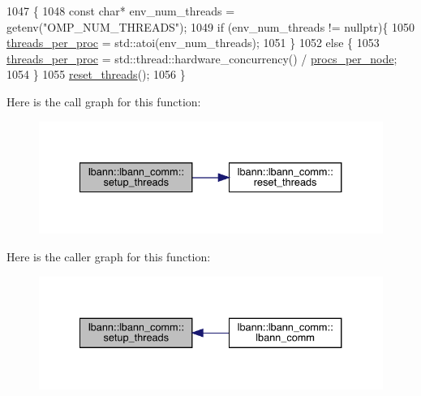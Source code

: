 \begin{DoxyCode}
1047                                \{
1048   \textcolor{keyword}{const} \textcolor{keywordtype}{char}* env\_num\_threads = getenv(\textcolor{stringliteral}{"OMP\_NUM\_THREADS"});
1049   \textcolor{keywordflow}{if} (env\_num\_threads != \textcolor{keyword}{nullptr})\{
1050     \hyperlink{classlbann_1_1lbann__comm_a23ff8e3563e4472af29d15f6cb823bc1}{threads\_per\_proc} = std::atoi(env\_num\_threads);
1051   \}
1052   \textcolor{keywordflow}{else} \{
1053     \hyperlink{classlbann_1_1lbann__comm_a23ff8e3563e4472af29d15f6cb823bc1}{threads\_per\_proc} = std::thread::hardware\_concurrency() / 
      \hyperlink{classlbann_1_1lbann__comm_a2ffc59f0c1d97df2ca6845312c8c8b3e}{procs\_per\_node};
1054   \}
1055   \hyperlink{classlbann_1_1lbann__comm_a10f13918019cd2e021768e3388355ba2}{reset\_threads}();
1056 \}
\end{DoxyCode}
Here is the call graph for this function\+:\nopagebreak
\begin{figure}[H]
\begin{center}
\leavevmode
\includegraphics[width=334pt]{classlbann_1_1lbann__comm_a597189b10f61947580f97fb8d1da7355_cgraph}
\end{center}
\end{figure}
Here is the caller graph for this function\+:\nopagebreak
\begin{figure}[H]
\begin{center}
\leavevmode
\includegraphics[width=334pt]{classlbann_1_1lbann__comm_a597189b10f61947580f97fb8d1da7355_icgraph}
\end{center}
\end{figure}
\mbox{\label{classlbann_1_1lbann__comm_a0ae02c4083623d2e1381336a73fdb379}} 
